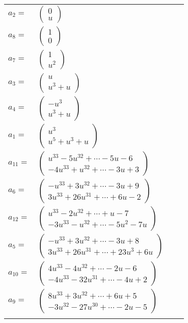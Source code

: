\documentclass[1p]{elsarticle_modified}
\theoremstyle{definition}
\begin{document}
\begin{tabular}{m{7pt} m{180pt} m{7pt} m{180pt} }
\flushright $a_{2}=$&$\begin{pmatrix}0\\u\end{pmatrix}$ \\
\flushright $a_{8}=$&$\begin{pmatrix}1\\0\end{pmatrix}$ \\
\flushright $a_{7}=$&$\begin{pmatrix}1\\u^2\end{pmatrix}$ \\
\flushright $a_{3}=$&$\begin{pmatrix}u\\u^3+u\end{pmatrix}$ \\
\flushright $a_{4}=$&$\begin{pmatrix}- u^3\\u^3+u\end{pmatrix}$ \\
\flushright $a_{1}=$&$\begin{pmatrix}u^3\\u^5+u^3+u\end{pmatrix}$ \\
\flushright $a_{11}=$&$\begin{pmatrix}u^{33}-5 u^{32}+\cdots-5 u-6\\-4 u^{33}+u^{32}+\cdots-3 u+3\end{pmatrix}$ \\
\flushright $a_{6}=$&$\begin{pmatrix}- u^{33}+3 u^{32}+\cdots-3 u+9\\3 u^{33}+26 u^{31}+\cdots+6 u-2\end{pmatrix}$ \\
\flushright $a_{12}=$&$\begin{pmatrix}u^{33}-2 u^{32}+\cdots+u-7\\-3 u^{33}- u^{32}+\cdots-5 u^2-7 u\end{pmatrix}$ \\
\flushright $a_{5}=$&$\begin{pmatrix}- u^{33}+3 u^{32}+\cdots-3 u+8\\3 u^{33}+26 u^{31}+\cdots+23 u^3+6 u\end{pmatrix}$ \\
\flushright $a_{10}=$&$\begin{pmatrix}4 u^{33}-4 u^{32}+\cdots-2 u-6\\-4 u^{33}-32 u^{31}+\cdots-4 u+2\end{pmatrix}$ \\
\flushright $a_{9}=$&$\begin{pmatrix}8 u^{33}+3 u^{32}+\cdots+6 u+5\\-3 u^{32}-27 u^{30}+\cdots-2 u-5\end{pmatrix}$\\&\end{tabular}
\end{document}
